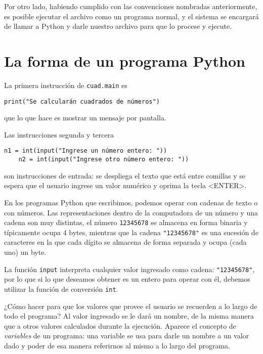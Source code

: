 \begin{observacion}
Por otro lado, habiendo cumplido con las convenciones nombradas
anteriormente, es posible ejecutar el archivo como un programa normal, y el
sistema se encargará de llamar a Python y darle nuestro archivo para que lo
procese y ejecute.
\end{observacion}

\section{La forma de un programa Python}

La primera instrucción de \verb+cuad.main+ es
\begin{lstlisting}[firstnumber=6]
    print("Se calcularán cuadrados de números")
\end{lstlisting}
que lo que hace es mostrar un mensaje por pantalla.

Las instrucciones segunda y tercera
\begin{lstlisting}[firstnumber=8]
    n1 = int(input("Ingrese un número entero: "))
    n2 = int(input("Ingrese otro número entero: "))
\end{lstlisting}
son instrucciones de entrada: se despliega el texto que está entre
comillas y se espera que el usuario ingrese un valor numérico y
oprima la tecla <ENTER>.

\begin{sabias_que}
En los programas Python que escribimos, podemos operar con cadenas de texto
o con números.  Las representaciones dentro de la computadora de un número y
una cadena son muy distintas, el número \lstinline!12345678! se almacena en
forma binaria y típicamente ocupa 4 bytes, mientras que la cadena
\lstinline!"12345678"! es una sucesión de caracteres en la que cada dígito se
almacena de forma separada y ocupa (cada uno) un byte.

La función \lstinline!input! interpreta cualquier valor ingresado como cadena:
\lstinline!"12345678"!, por lo que si lo que deseamos obtener es un entero para
operar con él, debemos utilizar la función de conversión \lstinline!int!.
\end{sabias_que}

¿Cómo hacer para que los valores que provee el usuario se recuerden
a lo largo de todo el programa? Al valor ingresado se le dará un
nombre, de la misma manera que a otros valores calculados durante
la ejecución. Aparece el concepto de {\it variables} de un
programa: una variable se usa para darle un nombre a un valor dado
y poder de esa manera referirnos al mismo a lo largo del
programa.

